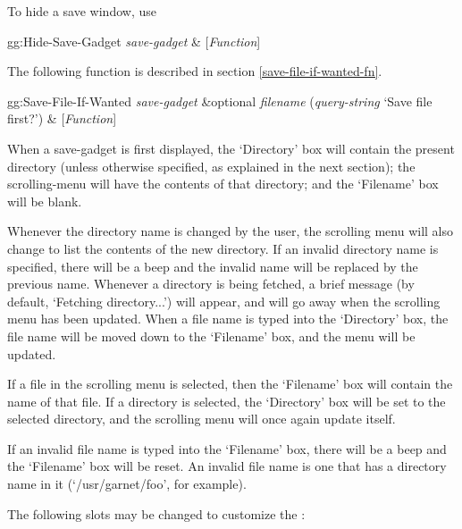 To hide a save window, use
\begin{programexample}
gg:Hide-Save-Gadget {\it save-gadget} & [{\it Function}]
\end{programexample}

The following function is described in section \ref{save-file-if-wanted-fn}.

\begin{programexample}
gg:Save-File-If-Wanted {\it save-gadget} \&optional {\it filename} ({\it query-string} `Save file first?') & [{\it Function}]
\end{programexample}


When a save-gadget is first displayed, the `Directory' box will
contain the present directory (unless otherwise specified, as
explained in the next section); the scrolling-menu will have the
contents of that directory; and the `Filename' box will be blank.

Whenever the directory name is changed by the user, the scrolling menu
will also change to list the contents of the new directory.  If an invalid
directory name is specified, there will be a beep and the invalid name
will be replaced by the previous name.  Whenever a directory is being
fetched, a brief message (by default, `Fetching directory...') will
appear, and will go away when the scrolling menu has been updated.  When a
file name is typed into the `Directory' box, the file name will be moved
down to the `Filename' box, and the menu will be updated.

If a file in the scrolling menu is selected, then the `Filename'
box will contain the name of that file.  If a directory is selected,
the `Directory' box will be set to the selected directory, and the
scrolling menu will once again update itself.

If an invalid file name is typed into the `Filename' box, there will
be a beep and the `Filename' box will be reset. An invalid file name
is one that has a directory name in it (`/usr/garnet/foo', for
example).

The following slots may be changed to customize the :

